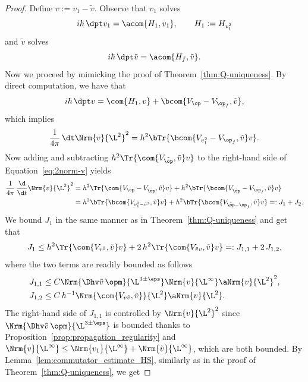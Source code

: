 \begin{proof}
Define $v:=v_1-\tilde{v}$. Observe that $v_1$ solves
\begin{equation*}
i\hbar\,\dpt v_1=\acom{H_1,v_1},\quad\quad H_1:=H_{v_1^2}
\end{equation*}
and $\tilde{v}$ solves
\begin{equation*}
i\hbar\,\dpt \tilde{v}=\acom{H_f,\tilde{v}}.
\end{equation*}
Now we proceed by mimicking the proof of Theorem~\ref{thm:Q-uniqueness}. By direct computation, we have that
\begin{equation*}
i\hbar\,\dpt v = \com{H_1,v}+\bcom{V_{\op}-V_{\op_f},\tilde{v}},
\end{equation*}
which implies
\begin{equation}\label{eq:2norm-v}
\frac{1}{4\pi}\,\dt\Nrm{v}{\L^2}^2 = h^2 \bTr{\bcom{V_{v_1^2}-V_{\op_f},\tilde{v}}v}.
\end{equation}
Now adding and subtracting $h^2 \Tr{\com{V_{\tilde{\op}},\tilde{v}}v}$ to the right-hand side of Equation~\eqref{eq:2norm-v} yields
\begin{equation}\label{eq:L2-estimate}
\begin{split}
\frac{1}{4\pi}\,\frac{\d}{\d t}\Nrm{v}{\L^2}^2 &= h^2 \Tr{\com{V_{\op}-V_{\tilde{\op}},\tilde{v}}v} + h^2 \bTr{\bcom{V_{\tilde{\op}}-V_{\op_f},\tilde{v}}v}
\\
&= h^2 \bTr{\bcom{V_{v_1^2-\tilde{v}^2},\tilde{v}}v} + h^2 \bTr{\bcom{V_{\tilde{\op}-\op_f},\tilde{v}}v}
=: J_1+J_2.
\end{split}
\end{equation}
We bound $J_1$ in the same manner as in Theorem~\ref{thm:Q-uniqueness} and get that
\begin{equation*}
J_1 \leq h^2 \Tr{\com{V_{v^2},\tilde{v}}v} + 2\, h^2 \Tr{\com{V_{\tilde{v}v},\tilde{v}}v} =: J_{1,1}+2\,J_{1,2},
\end{equation*}
where the two terms are readily bounded as follows
\begin{align*}
J_{1,1} &\leq C \Nrm{\Dhv\tilde{v}\,\opm}{\L^{3\pm\eps}}\Nrm{v}{\L^\infty}\aNrm{v}{\L^2}^2,
\\
J_{1,2} &\leq C\, { h^{-1}\Nrm{\com{V_{v\tilde{v}},\tilde{v}}}{\L^2}\aNrm{v}{\L^2}}.
\end{align*}
The right-hand side of $J_{1,1}$ is controlled by $\Nrm{v}{\L^2}^2$ since $\Nrm{\Dhv \tilde{v}\,\opm}{\L^{3\pm\eps}}$ is bounded thanks to Proposition~\ref{prop:propagation_regularity} and $\Nrm{v}{\L^\infty} \leq \Nrm{v_1}{\L^\infty} + \Nrm{\tilde{v}}{\L^\infty}$, which are both bounded. By Lemma~\ref{lem:commutator_estimate_HS}, similarly as in the proof of Theorem~\ref{thm:Q-uniqueness}, we get

\end{proof}
